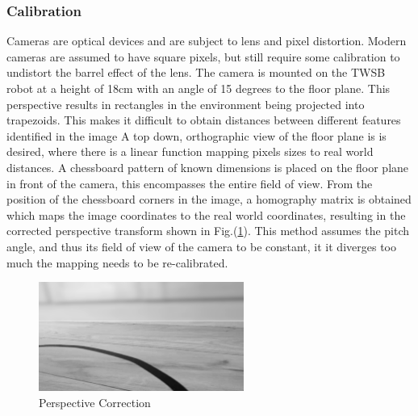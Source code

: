         \subsubsection{Calibration}
        Cameras are optical devices and are subject to lens and pixel distortion. Modern cameras are assumed to have square pixels, 
        but still require some calibration to undistort the barrel effect of the lens. 
        The camera is mounted on the TWSB robot at a height of 18cm with an angle of 15 degrees to the floor plane.
        This perspective results in rectangles in the environment being projected into trapezoids.  This makes it difficult to 
        obtain distances between different features identified in the image \cite{tuohy2010distance}
        A top down, orthographic view of the floor plane is is desired, where there is a linear function mapping pixels sizes 
        to real world distances. A chessboard pattern of known dimensions is placed on the floor plane in front of the camera, 
        this encompasses the entire field of view. From the position of the chessboard corners in the image, 
        a homography matrix is obtained which maps the image coordinates to the real world coordinates, 
        resulting in the corrected perspective transform shown in Fig.(\ref{fig:perspective}). 
        This method assumes the pitch angle, and thus its field of view of the camera to be constant, it it diverges too much the 
        mapping needs to be re-calibrated. 
        \begin{figure}[H]
            \centering
            \includegraphics[width=0.6\textwidth]{visionpipeline/WallCuveLeft.png}
            \caption{Perspective Correction}
            \label{fig:perspective}
        \end{figure}

        \pagebreak{}
